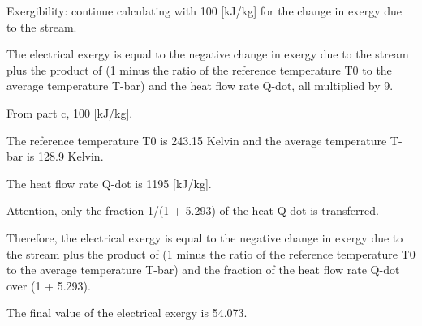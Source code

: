 Exergibility: continue calculating with 100 [kJ/kg] for the change in exergy due to the stream.

The electrical exergy is equal to the negative change in exergy due to the stream plus the product of (1 minus the ratio of the reference temperature T0 to the average temperature T-bar) and the heat flow rate Q-dot, all multiplied by 9.

From part c, 100 [kJ/kg].

The reference temperature T0 is 243.15 Kelvin and the average temperature T-bar is 128.9 Kelvin.

The heat flow rate Q-dot is 1195 [kJ/kg].

Attention, only the fraction 1/(1 + 5.293) of the heat Q-dot is transferred.

Therefore, the electrical exergy is equal to the negative change in exergy due to the stream plus the product of (1 minus the ratio of the reference temperature T0 to the average temperature T-bar) and the fraction of the heat flow rate Q-dot over (1 + 5.293).

The final value of the electrical exergy is 54.073.